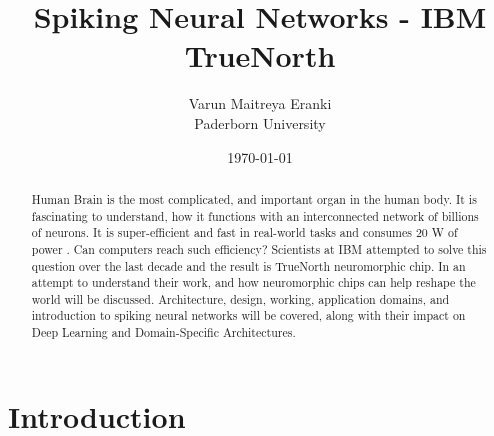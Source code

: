 \documentclass[11pt,twoside]{article}
\newcommand{\participant}{Varun Maitreya Eranki}
\newcommand{\affiliation}{Paderborn University}
\newcommand{\topic}{Spiking Neural Networks - IBM TrueNorth}
\newcommand{\submissiondate}{\today}
\begin{document}
\title{\topic}
\author{\Large{\participant}\\ \affiliation \\ {\small \emailaddress}}
\date{\submissiondate}
\maketitle
\thispagestyle{empty}


\begin{abstract}
Human Brain is the most complicated, and important organ in the human body. It is fascinating to understand, how it functions with an interconnected network of billions of neurons. It is super-efficient and fast in real-world tasks and consumes 20 W of power \cite{hsu2009much, modha2017introducing}. Can computers reach such efficiency? Scientists at IBM attempted to solve this question over the last decade and the result is TrueNorth neuromorphic chip. In an attempt to understand their work, and how neuromorphic chips can help reshape the world will be discussed. Architecture, design, working, application domains, and introduction to spiking neural networks will be covered, along with their impact on Deep Learning and Domain-Specific Architectures.
\end{abstract}


\section{Introduction}
\label{sec:introduction}

\end{document}
